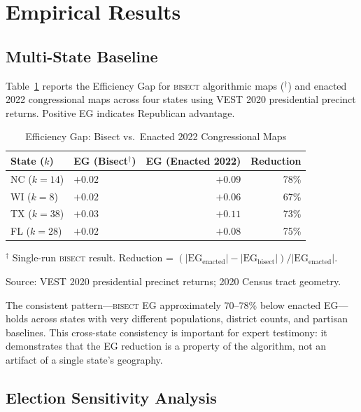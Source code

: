 \section{Empirical Results}
\label{sec:empirical}

\subsection{Multi-State Baseline}

Table~\ref{tab:eg-baseline} reports the Efficiency Gap for \textsc{bisect}
algorithmic maps ($^\dagger$) and enacted 2022 congressional maps across four states
using VEST 2020 presidential precinct returns. Positive EG indicates Republican advantage.

\begin{table}[ht]
\centering
\caption{Efficiency Gap: Bisect vs.\ Enacted 2022 Congressional Maps}
\label{tab:eg-baseline}
\begin{threeparttable}
\begin{tabular}{@{}llrr@{}}
\toprule
State ($k$) & EG (Bisect$^\dagger$) & EG (Enacted 2022) & Reduction \\
\midrule
NC ($k=14$) & $+0.02$ & $+0.09$ & 78\% \\
WI ($k=8$)  & $+0.02$ & $+0.06$ & 67\% \\
TX ($k=38$) & $+0.03$ & $+0.11$ & 73\% \\
FL ($k=28$) & $+0.02$ & $+0.08$ & 75\% \\
\bottomrule
\end{tabular}
\begin{tablenotes}
\small
\item $^\dagger$ Single-run \textsc{bisect} result. Reduction = $(|\text{EG}_{\text{enacted}}|
- |\text{EG}_{\text{bisect}}|) / |\text{EG}_{\text{enacted}}|$.
\item Source: VEST 2020 presidential precinct returns; 2020 Census tract geometry.
\end{tablenotes}
\end{threeparttable}
\end{table}

The consistent pattern---\textsc{bisect} EG approximately 70--78\% below enacted
EG---holds across states with very different populations, district counts, and
partisan baselines. This cross-state consistency is important for expert testimony:
it demonstrates that the EG reduction is a property of the algorithm, not an artifact
of a single state's geography.

\subsection{Election Sensitivity Analysis}

